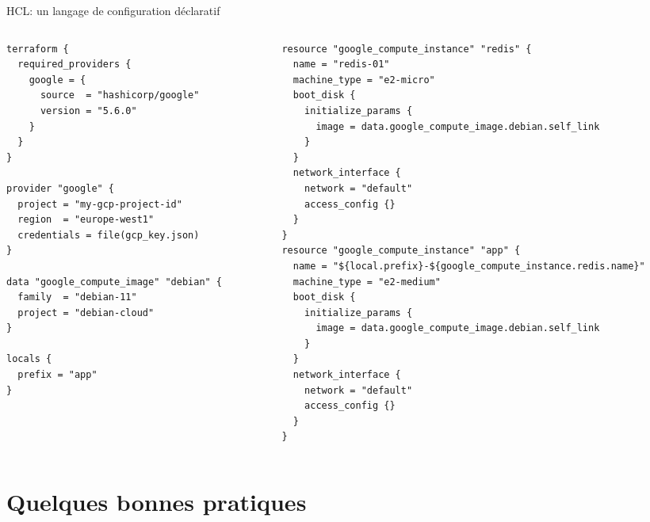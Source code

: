 \documentclass[aspectratio=169,10pt]{beamer}
\begin{document}
\begin{frame}[fragile]{HCL: un langage de configuration déclaratif}

\begin{columns}[T]
  \begin{column}{0.43\textwidth}
    \begin{lstlisting}[language=HCL, basicstyle=\ttfamily\scriptsize]
terraform {
  required_providers {
    google = {
      source  = "hashicorp/google"
      version = "5.6.0"
    }
  }
}

provider "google" {
  project = "my-gcp-project-id"
  region  = "europe-west1"
  credentials = file(gcp_key.json)
}

data "google_compute_image" "debian" {
  family  = "debian-11"
  project = "debian-cloud"
}

locals {
  prefix = "app"
}
\end{lstlisting}
\end{column}

\begin{column}{0.57\textwidth}
\begin{lstlisting}[language=HCL, basicstyle=\ttfamily\scriptsize]
resource "google_compute_instance" "redis" {
  name = "redis-01"
  machine_type = "e2-micro"
  boot_disk {
    initialize_params {
      image = data.google_compute_image.debian.self_link
    }
  }
  network_interface {
    network = "default"
    access_config {}
  }
}
resource "google_compute_instance" "app" {
  name = "${local.prefix}-${google_compute_instance.redis.name}"
  machine_type = "e2-medium"
  boot_disk {
    initialize_params {
      image = data.google_compute_image.debian.self_link
    }
  }
  network_interface {
    network = "default"
    access_config {}
  }
}
\end{lstlisting}
\end{column}
\end{columns}
\end{frame}


\section{Quelques bonnes pratiques}
\end{document}
